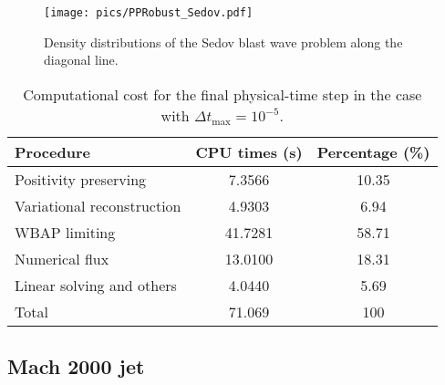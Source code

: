 \begin{figure}[htbp]
    \centering
    \texttt{[image: pics/PPRobust\_Sedov.pdf]}
    \caption{Density distributions of the Sedov blast wave problem along the diagonal line.}
    \label{fig:sedovLine}
\end{figure}

\begin{table}[htbp!]
    \centering
    \caption{Computational cost for the final physical-time step in the case with $\Delta t_{\text{max}} = 10^{-5}$.}
    \label{tab:cpu-time-cost}
    \setlength{\tabcolsep}{12.5pt} %
    \renewcommand{\arraystretch}{1.2}
    \begin{tabular}{l c c}
        \toprule
        Procedure & CPU times (s) & Percentage (\%) \\
        \midrule
        Positivity preserving & 7.3566 & 10.35\\
        Variational reconstruction & 4.9303 & 6.94\\
        WBAP limiting & 41.7281 & 58.71\\
        Numerical flux & 13.0100 & 18.31\\
        Linear solving and others &  4.0440 & 5.69\\
        \midrule
        {Total} & 71.069 & 100 \\
    \bottomrule
    \end{tabular}
\end{table}

\subsection{Mach 2000 jet}

